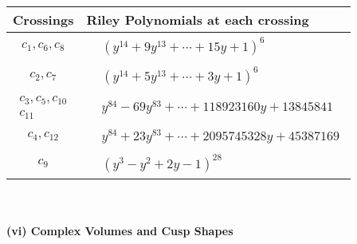 \documentclass[1p]{elsarticle_modified}
\theoremstyle{definition}
\begin{document}
\begin{tabular}{m{50pt}|m{274pt}}
Crossings & \hspace{64pt}Riley Polynomials at each crossing \\
\hline $$\begin{aligned}c_{1},c_{6},c_{8}\end{aligned}$$&$\begin{aligned}
&(y^{14}+9 y^{13}+\cdots+15 y+1)^{6}
\end{aligned}$\\
\hline $$\begin{aligned}c_{2},c_{7}\end{aligned}$$&$\begin{aligned}
&(y^{14}+5 y^{13}+\cdots+3 y+1)^{6}
\end{aligned}$\\
\hline $$\begin{aligned}c_{3},c_{5},c_{10}\\c_{11}\end{aligned}$$&$\begin{aligned}
&y^{84}-69 y^{83}+\cdots+118923160 y+13845841
\end{aligned}$\\
\hline $$\begin{aligned}c_{4},c_{12}\end{aligned}$$&$\begin{aligned}
&y^{84}+23 y^{83}+\cdots+2095745328 y+45387169
\end{aligned}$\\
\hline $$\begin{aligned}c_{9}\end{aligned}$$&$\begin{aligned}
&(y^3- y^2+2 y-1)^{28}
\end{aligned}$\\
\hline
\end{tabular}\\~\\
\newpage\flushleft \textbf{(vi) Complex Volumes and Cusp Shapes}
\end{document}
